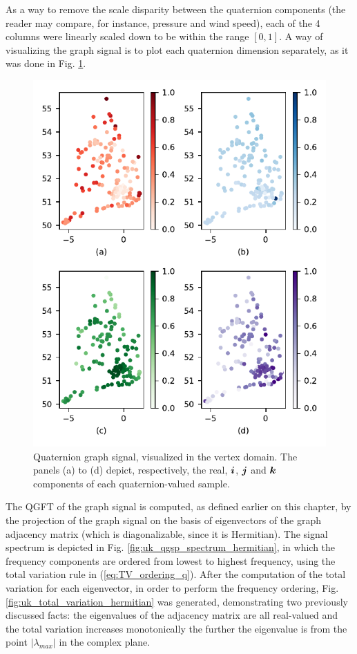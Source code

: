 As a way to remove the scale disparity between the quaternion components (the reader may compare, for instance, pressure and wind speed), each of the 4 columns were linearly scaled down to be within the range $[0, 1]$. A way of visualizing the graph signal is to plot each quaternion dimension separately, as it was done in Fig. \ref{fig:uk_qgsp_graphsig}.

\begin{figure}
    \centering
    \includegraphics[width=0.55\linewidth]{Figures/uk_signal.pdf}
    \caption{Quaternion graph signal, visualized in the vertex domain. The panels (a) to (d) depict, respectively, the real, $\boldsymbol{i}$, $\boldsymbol{j}$ and $\boldsymbol{k}$ components of each quaternion-valued sample.}
    \label{fig:uk_qgsp_graphsig}
\end{figure}

The QGFT of the graph signal is computed, as defined earlier on this chapter, by the projection of the graph signal on the basis of eigenvectors of the graph adjacency matrix (which is diagonalizable, since it is Hermitian). The signal spectrum is depicted in Fig. \ref{fig:uk_qgsp_spectrum_hermitian}, in which the frequency components are ordered from lowest to highest frequency, using the total variation rule in (\ref{eq:TV_ordering_q}). After the computation of the total variation for each eigenvector, in order to perform the frequency ordering, Fig. \ref{fig:uk_total_variation_hermitian} was generated, demonstrating two previously discussed facts: the eigenvalues of the adjacency matrix are all real-valued and the total variation increases monotonically the further the eigenvalue is from the point $|\lambda_{max}|$ in the complex plane.

